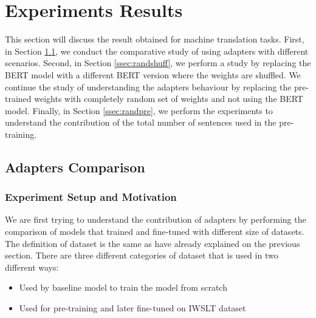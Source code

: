 \section{Experiments Results}
This section will discuss the result obtained for machine translation tasks. First, in Section \ref{ssec:adaptcomp}, we conduct the comparative study of using adapters with different scenarios. Second, in Section \ref{ssec:randshuff}, we perform a study by replacing the BERT model with a different BERT version where the weights are shuffled. We continue the study of understanding the adapters behaviour by replacing the pre-trained weights with completely random set of weights and not using the BERT model. Finally, in Section \ref{ssec:randpre}, we perform the experiments to understand the contribution of the total number of sentences used in the pre-training.

\subsection{Adapters Comparison}
\label{ssec:adaptcomp}
\subsubsection{Experiment Setup and Motivation}
We are first trying to understand the contribution of adapters by performing the comparison of models that trained and fine-tuned with different size of datasets. The definition of dataset is the same as have already explained on the previous section. There are three different categories of dataset that is used in two different ways:
\begin{itemize}
    \item Used by baseline model to train the model from scratch
    \item Used for pre-training and later fine-tuned on IWSLT dataset
\end{itemize}

